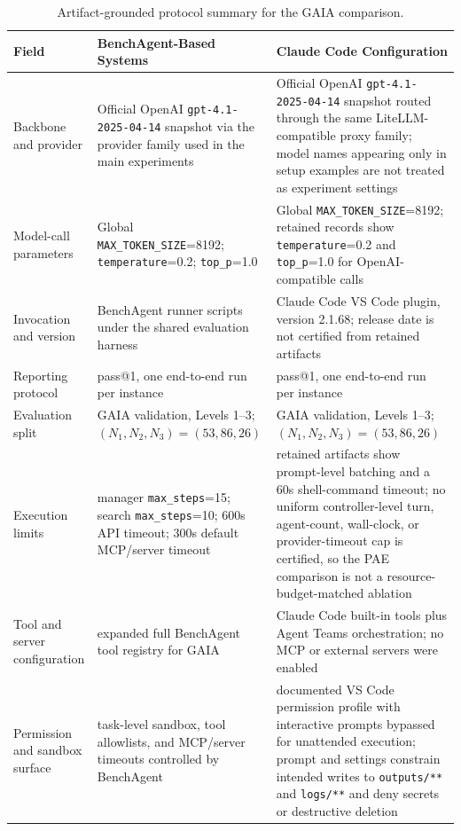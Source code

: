 \begin{table}[t]
    \centering
    \caption{Artifact-grounded protocol summary for the GAIA comparison.}
    \label{tab:appendix_gaia_protocol_summary}
    \footnotesize
    \setlength{\tabcolsep}{3.5pt}
    \renewcommand{\arraystretch}{1.04}
    \begin{tabular}{>{\raggedright\arraybackslash}p{} >{\raggedright\arraybackslash}p{} >{\raggedright\arraybackslash}p{}}
        \toprule
        \textbf{Field} & \textbf{BenchAgent-Based Systems} & \textbf{Claude Code Configuration} \\
        \midrule
        Backbone and provider & Official OpenAI \texttt{gpt-4.1-2025-04-14} snapshot via the provider family used in the main experiments & Official OpenAI \texttt{gpt-4.1-2025-04-14} snapshot routed through the same LiteLLM-compatible proxy family; model names appearing only in setup examples are not treated as experiment settings \\
        Model-call parameters & Global \texttt{MAX\_TOKEN\_SIZE}=8192; \texttt{temperature}=0.2; \texttt{top\_p}=1.0 & Global \texttt{MAX\_TOKEN\_SIZE}=8192; retained records show \texttt{temperature}=0.2 and \texttt{top\_p}=1.0 for OpenAI-compatible calls \\
        Invocation and version & BenchAgent runner scripts under the shared evaluation harness & Claude Code VS Code plugin, version 2.1.68; release date is not certified from retained artifacts \\
        Reporting protocol & pass@1, one end-to-end run per instance & pass@1, one end-to-end run per instance \\
        Evaluation split & GAIA validation, Levels 1--3; $(N_1,N_2,N_3)=(53,86,26)$ & GAIA validation, Levels 1--3; $(N_1,N_2,N_3)=(53,86,26)$ \\
        Execution limits & manager \texttt{max\_steps}=15; search \texttt{max\_steps}=10; 600s API timeout; 300s default MCP/server timeout & retained artifacts show prompt-level batching and a 60s shell-command timeout; no uniform controller-level turn, agent-count, wall-clock, or provider-timeout cap is certified, so the PAE comparison is not a resource-budget-matched ablation \\
        Tool and server configuration & expanded full BenchAgent tool registry for GAIA & Claude Code built-in tools plus Agent Teams orchestration; no MCP or external servers were enabled \\
        Permission and sandbox surface & task-level sandbox, tool allowlists, and MCP/server timeouts controlled by BenchAgent & documented VS Code permission profile with interactive prompts bypassed for unattended execution; prompt and settings constrain intended writes to \texttt{outputs/**} and \texttt{logs/**} and deny secrets or destructive deletion \\

\end{tabular}
\end{table}

